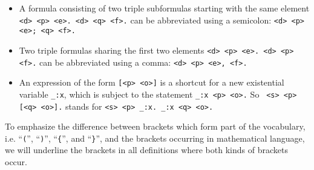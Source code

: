 \begin{remark}\label{rem}
\begin{itemize}
\item A formula consisting of two triple subformulas starting with the same element \verb!<d> <p> <e>. <d> <q> <f>.! can be abbreviated using a semicolon:\newline 
\verb!<d> <p> <e>; <q> <f>.!
\item Two triple formulas sharing the first two elements  \verb!<d> <p> <e>. <d> <p> <f>.! can be abbreviated using a comma: \verb!<d> <p> <e>, <f>.!
 \item An expression of the form \verb![<p> <o>]! is a shortcut for a new existential variable \verb!_:x!,
   which is subject to the statement \verb!_:x <p> <o>.! %
   So \verb! <s> <p> [<q> <o>].! stands for \verb!<s> <p> _:x. _:x <q> <o>.!
 \end{itemize}
\end{remark}



To emphasize the difference between brackets which form part of the \nthree vocabulary, i.e. ``\verb!(!'', ``\verb!)!'', ``\verb!{!'', and ``\verb!}!'', 
and the brackets occurring in mathematical language, we will underline the \nthree brackets in all definitions where both kinds of brackets occur.
